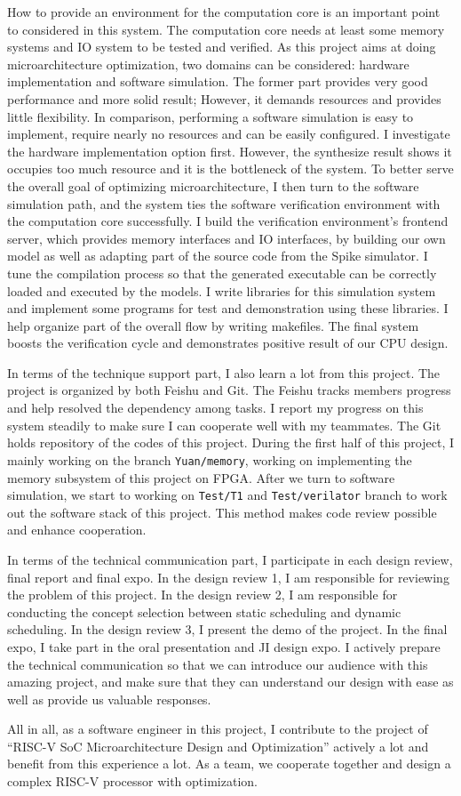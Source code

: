 How to provide an environment for the computation core is an important point to considered in this system. The computation core needs at least some memory systems and IO system to be tested and verified. As this project aims at doing microarchitecture optimization, two domains can be considered: hardware implementation and software simulation. The former part provides very good performance and more solid result; However, it demands resources and provides little flexibility. In comparison, performing a software simulation is easy to implement, require nearly no resources and can be easily configured. I investigate the hardware implementation option first. However, the synthesize result shows it occupies too much resource and it is the bottleneck of the system. To better serve the overall goal of optimizing microarchitecture, I then turn to the software simulation path, and the system ties the software verification environment with the computation core successfully. I build the verification environment’s frontend server, which provides memory interfaces and IO interfaces, by building our own model as well as adapting part of the source code from the Spike simulator. I tune the compilation process so that the generated executable can be correctly loaded and executed by the models. I write libraries for this simulation system and implement some programs for test and demonstration using these libraries. I help organize part of the overall flow by writing makefiles. The final system boosts the verification cycle and demonstrates positive result of our CPU design.

In terms of the technique support part, I also learn a lot from this project. The project is organized by both Feishu and Git. The Feishu tracks members progress and help resolved the dependency among tasks. I report my progress on this system steadily to make sure I can cooperate well with my teammates. The Git holds repository of the codes of this project. During the first half of this project, I mainly working on the branch \texttt{Yuan/memory}, working on implementing the memory subsystem of this project on FPGA. After we turn to software simulation, we start to working on \texttt{Test/T1} and \texttt{Test/verilator} branch to work out the software stack of this project. This method makes code review possible and enhance cooperation.

In terms of the technical communication part, I participate in each design review, final report and final expo. In the design review 1, I am responsible for reviewing the problem of this project. In the design review 2, I am responsible for conducting the concept selection between static scheduling and dynamic scheduling. In the design review 3, I present the demo of the project. In the final expo, I take part in the oral presentation and JI design expo. I actively prepare the technical communication so that we can introduce our audience with this amazing project, and make sure that they can understand our design with ease as well as provide us valuable responses.

All in all, as a software engineer in this project, I contribute to the project of ``RISC-V SoC Microarchitecture Design and Optimization'' actively a lot and benefit from this experience a lot. As a team, we cooperate together and design a complex RISC-V processor with optimization.
